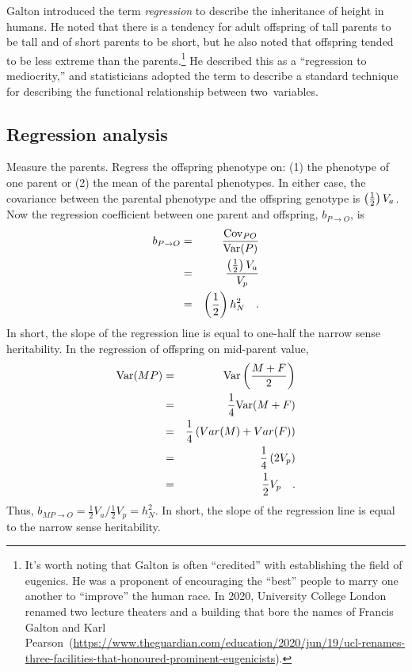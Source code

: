 \documentclass[12pt]{article}
\begin{document}
Galton introduced the term {\it regression\/} to describe the
inheritance of height in humans. He noted that there is a tendency for
adult offspring of tall parents to be tall and of short parents to be
short, but he also noted that offspring tended to be less extreme than
the parents.\footnote{It's worth noting that Galton is often
  ``credited'' with establishing the field of eugenics. He was a
  proponent of encouraging the ``best'' people to marry one another to
  ``improve'' the human race. In 2020, University College London
  renamed two lecture theaters and a building that bore the names of
  Francis Galton and Karl Pearson~(\url{https://www.theguardian.com/education/2020/jun/19/ucl-renames-three-facilities-that-honoured-prominent-eugenicists}).}
He described this as a ``regression to mediocrity,'' and statisticians
adopted the term to describe a standard technique for describing the
functional relationship between two~variables.

\subsection*{Regression analysis}

Measure the parents.  Regress the offspring phenotype on: (1) the
phenotype of one parent or (2) the mean of the parental
phenotypes.  In either case, the covariance between the parental
phenotype and the offspring genotype is $\left({1 \over 2}\right)V_a$.
Now the regression coefficient between one parent and offspring, $b_{P
\rightarrow O}$, is
\begin{eqnarray*}
b_{P \rightarrow O}
&=& \frac{\mbox{Cov}_{PO}}{\mbox{Var}(P)} \\
&=& {\left({1 \over 2}\right)V_a \over V_p} \\
&=& \left({1 \over 2}\right)h^2_N \quad .
\end{eqnarray*}
In short, the slope of the regression line is equal to one-half the
narrow sense heritability.  In the regression of offspring on
mid-parent value,
\begin{eqnarray*}
\mbox{Var}(MP) &=& \mbox{Var}\left(\frac{M+F}{2}\right) \\
                  &=& \frac{1}{4} \mbox{Var}(M+F) \\
                  &=& \frac{1}{4} \left(Var(M) + Var(F)\right) \\
                  &=& \frac{1}{4} \left(2V_p\right) \\
                  &=& \frac{1}{2} V_p \quad .
\end{eqnarray*}
Thus, $b_{MP \rightarrow O} = \frac{1}{2}V_a/\frac{1}{2}V_p = h^2_N$.
In short, the slope of the regression line is equal to the narrow
sense heritability.
\end{document}
